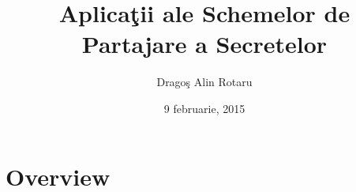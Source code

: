 \documentclass{beamer}
\title[Universitatea din Bucure\c{s}ti]{Aplica\c{t}ii ale Schemelor de Partajare a Secretelor}
\author[Drago\c{s} Alin Rotaru]{Drago\c{s} Alin Rotaru} %
\institute[UniBuc] %
{
Universitatea din Bucure\c{s}ti\\ %
}
\date{9 februarie, 2015} %
\theoremstyle{definition}
\begin{document}
\begin{frame}
\titlepage %
\end{frame}



\section{Overview} %
\end{document}
